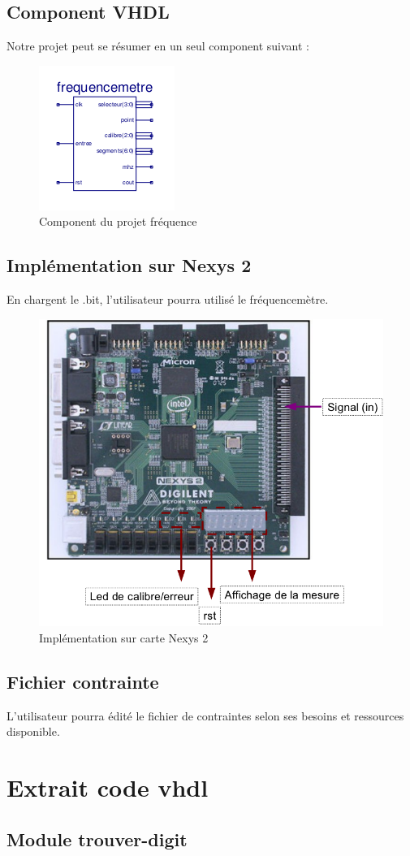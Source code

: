 \documentclass[a4paper,11pt]{article}
\begin{document}
\subsection{Component VHDL}
Notre projet peut se résumer en un seul component suivant :
\begin{figure}[H]
\begin{center}
	\includegraphics[scale=1]{freqa0.png}
	\caption{Component du projet fréquence}
\end{center}
\end{figure}

\subsection{Implémentation sur Nexys 2}
En chargent le .bit, l'utilisateur pourra utilisé le fréquencemètre.
\begin{figure}[H]
\begin{center}
	\includegraphics[scale=.5]{fpga.png}
	\caption{Implémentation sur carte Nexys 2}
\end{center}
\end{figure}

\subsection{Fichier contrainte}
L'utilisateur pourra édité le fichier de contraintes selon ses besoins et ressources disponible.

\newpage
\section{Extrait code vhdl}
\subsection{Module trouver-digit}

\end{document}
